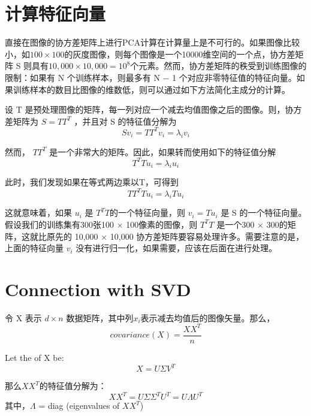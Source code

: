\documentclass[UTF8]{ctexart}
\begin{document}
\section{计算特征向量}
直接在图像的协方差矩阵上进行PCA计算在计算量上是不可行的。如果图像比较小，如$100 \times 100$的灰度图像，则每个图像是一个10000维空间的一个点，协方差矩阵 S 则具有$10,000 \times 10,000 = 10^8$个元素。然而，协方差矩阵的秩受到训练图像的限制：如果有 N 个训练样本，则最多有 N − 1 个对应非零特征值的特征向量。如果训练样本的数目比图像的维数低，则可以通过如下方法简化主成分的计算。

设 T 是预处理图像的矩阵，每一列对应一个减去均值图像之后的图像。则，协方差矩阵为 $S = TT^T$ ，并且对 S 的特征值分解为
\begin{equation}
	Sv_i = TT^Tv_i = \lambda_i v_i
\end{equation}

然而， $TT^T$ 是一个非常大的矩阵。因此，如果转而使用如下的特征值分解
\begin{equation}
	T^TTu_i = \lambda_i u_i
\end{equation}

此时，我们发现如果在等式两边乘以T，可得到
\begin{equation}
	TT^TTu_i = \lambda_i T u_i
\end{equation}

这就意味着，如果 $u_i$ 是 $T^TT$的一个特征向量，则 $v_i = Tu_i$ 是 S 的一个特征向量。假设我们的训练集有300张100 × 100像素的图像，则 $T^TT$ 是一个300 × 300的矩阵，这就比原先的 10,000 × 10,000 协方差矩阵要容易处理许多。需要注意的是，上面的特征向量 $v_i$ 没有进行归一化，如果需要，应该在后面在进行处理。

\section{Connection with SVD}
令 X 表示 $d\times n$ 数据矩阵，其中列$x_{i}$表示减去均值后的图像矢量。那么，
\begin{equation}
	covariance(X)=\frac {XX^{T}}{n}
\end{equation}

Let the {\color{blue}{singular value decomposition (SVD)}} of X be:
\begin{equation}
	X=U{\Sigma }V^{T}
\end{equation}

那么$XX^{T}$的特征值分解为：
\begin{equation}
	XX^{T}=U{\Sigma }{{\Sigma }^{T}}U^{T}=U{\Lambda }U^{T}
\end{equation}
 其中，$\Lambda$ = diag (eigenvalues of  $XX^{T}$)
 
\end{document}
